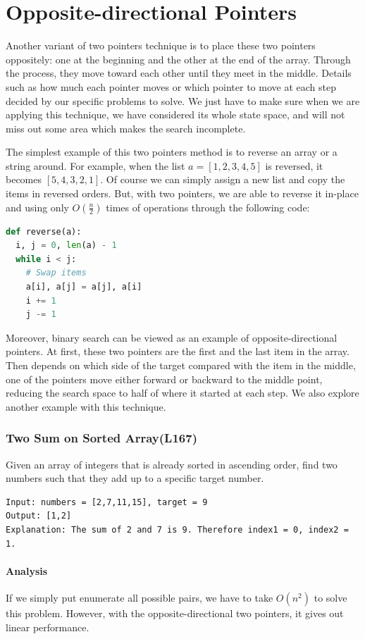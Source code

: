 \documentclass[../main.tex]{subfiles}
\begin{document}
\section{Opposite-directional Pointers}
Another variant of two pointers technique is to place these two pointers oppositely: one at the beginning and the other at the end of the array. Through the process, they move toward each other  until they meet in the middle. Details such as how much each pointer moves or which pointer to move at each step decided by our specific problems to solve. We just have to make sure when we are applying this technique, we have considered its whole state space, and will not miss out some area which makes the search incomplete. 

The simplest example of this two pointers method is to reverse an array or a string around. For example, when the list $a=[1, 2, 3, 4, 5]$ is reversed, it becomes $[5, 4, 3, 2, 1]$. Of course we can simply assign a new list and copy the items in reversed orders. But, with two pointers, we are able to reverse it in-place and using only $O(\frac{n}{2})$ times of operations through the following code:
\begin{lstlisting}[language=Python]
def reverse(a):
  i, j = 0, len(a) - 1
  while i < j:
    # Swap items
    a[i], a[j] = a[j], a[i]
    i += 1
    j -= 1
\end{lstlisting}
Moreover, binary search can be viewed as an example of opposite-directional pointers. At first, these two pointers are the first and the last item in the array. Then depends on which side of the target compared with the item in the middle, one of the pointers move either forward or backward to the middle point, reducing the search space to half of where it started at each step.  We also explore another example with this technique.
\subsubsection{Two Sum on Sorted Array(L167)} 
Given an array of integers that is already sorted in ascending order, find two numbers such that they add up to a specific target number. 
\begin{lstlisting}[numbers=none]
Input: numbers = [2,7,11,15], target = 9
Output: [1,2]
Explanation: The sum of 2 and 7 is 9. Therefore index1 = 0, index2 = 1.
\end{lstlisting}
\paragraph{Analysis} If we simply put enumerate all possible pairs, we have to take $O(n^2)$ to solve this problem. However, with the opposite-directional two pointers, it gives out linear performance.
\end{document}
